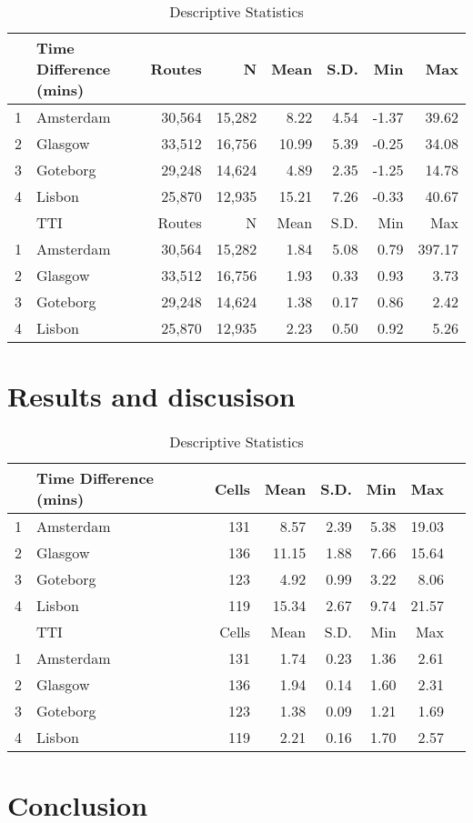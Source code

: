 \documentclass[a4paper]{jpconf}
\begin{document}
\begin{table}[ht]	
	\caption {Descriptive Statistics}
	\label{Results}
	\centering
	\begin{tabular}{rlrrrrrr}
		\hline
		& Time Difference (mins) & Routes & N & Mean & S.D. & Min & Max \\ 
		\hline
		1 & Amsterdam	& 30,564 & 15,282 & 8.22 	& 4.54 & -1.37 & 39.62 \\ 
		2 & Glasgow 	& 33,512 & 16,756 & 10.99 	& 5.39 & -0.25 & 34.08 \\ 
		3 & Goteborg 	& 29,248 & 14,624 & 4.89 	& 2.35 & -1.25 & 14.78 \\ 
		4 & Lisbon 		& 25,870 & 12,935 & 15.21 	& 7.26 & -0.33 & 40.67 \\
		
		\hline
		& TTI & Routes &  N & Mean & S.D. & Min & Max \\ 
		\hline
		1 & Amsterdam & 30,564 & 15,282 & 1.84 & 5.08 & 0.79 & 397.17 \\ 
		2 & Glasgow   & 33,512 & 16,756 & 1.93 & 0.33 & 0.93 & 3.73 \\ 
		3 & Goteborg  & 29,248 & 14,624 & 1.38 & 0.17 & 0.86 & 2.42 \\ 
		4 & Lisbon    & 25,870 & 12,935 & 2.23 & 0.50 & 0.92 & 5.26 \\ 
		\hline
	\end{tabular}
\end{table}




\section{Results and discusison}





\begin{table}[ht]	
	\caption {Descriptive Statistics}
	\label{Results}
	\centering
	\begin{tabular}{rlrrrrrr}
		\hline
		& Time Difference (mins) & Cells & Mean & S.D. & Min & Max \\ 
		\hline
		1 & Amsterdam 	& 131 & 8.57  & 2.39 & 5.38 & 19.03 \\ 
		2 & Glasgow 	& 136 & 11.15 & 1.88 & 7.66 & 15.64 \\ 
		3 & Goteborg 	& 123 & 4.92  & 0.99 & 3.22 & 8.06  \\ 
		4 & Lisbon 		& 119 & 15.34 & 2.67 & 9.74 & 21.57 \\ 
		
		\hline
		& TTI & Cells & Mean & S.D. & Min & Max \\ 
		\hline
		1 & Amsterdam 	& 131 & 1.74 & 0.23 & 1.36 & 2.61 \\ 
		2 & Glasgow 	& 136 & 1.94 & 0.14 & 1.60 & 2.31 \\ 
		3 & Goteborg	& 123 & 1.38 & 0.09 & 1.21 & 1.69 \\ 
		4 & Lisbon 		& 119 & 2.21 & 0.16 & 1.70 & 2.57 \\ 
		\hline
	\end{tabular}
\end{table}





\section{Conclusion}
\end{document}
